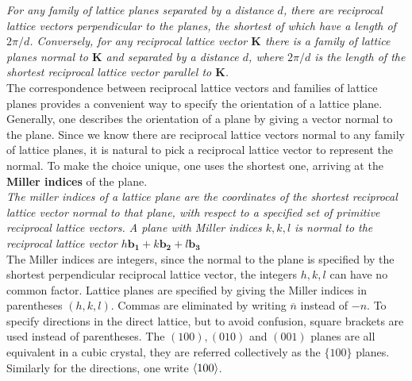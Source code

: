 \documentclass[10.75pt,a4paper,openright,bottom=2cm]{article}
\renewcommand{\Vec}[1]{\boldsymbol{#1}}
\begin{document}
\textit{For any family of lattice planes separated by a distance $d$, there are reciprocal lattice vectors perpendicular to the planes, the shortest of which have a length of $2\pi/d$. Conversely, for any reciprocal lattice vector $\Vec{K}$ there is a family of lattice planes normal to $\Vec{K}$ and separated by a distance $d$, where $2\pi/d$ is the length of the shortest reciprocal lattice vector parallel to $\Vec{K}$.}\\
The correspondence between reciprocal lattice vectors and families of lattice planes provides a convenient way to specify the orientation of a lattice plane. Generally, one describes the orientation of a plane by giving a vector normal to the plane. Since we know there are reciprocal lattice vectors normal to any family of lattice planes, it is natural to pick a reciprocal lattice vector to represent the normal. To make the choice unique, one uses the shortest one, arriving at the \textbf{Miller indices} of the plane.\\
\textit{The miller indices of a lattice plane are the coordinates of the shortest reciprocal lattice vector normal to that plane, with respect to a specified set of primitive reciprocal lattice vectors. A plane with Miller indices $k,k,l$ is normal to the reciprocal lattice vector $h\Vec{b_1}+k\Vec{b_2}+l\Vec{b_3}$}\\
The Miller indices are integers, since the normal to the plane is specified by the shortest perpendicular reciprocal lattice vector, the integers $h,k,l$ can have no common factor. Lattice planes are specified by giving the Miller indices in parentheses $(h,k,l)$. Commas are eliminated by writing $\overline{n}$ instead of $-n$. To specify directions in the direct lattice, but to avoid confusion, square brackets are used instead of parentheses. The $(100), (010)$ and $(001)$ planes are all equivalent in a cubic crystal, they are referred collectively as the $\{100\}$ planes. Similarly for the directions, one write $\Braket{100}$.
\end{document}
